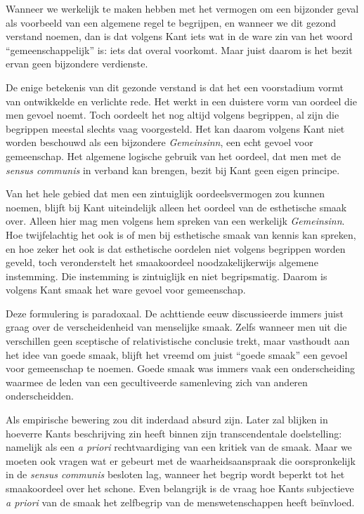 Wanneer we werkelijk te maken hebben met het vermogen om een bijzonder geval als voorbeeld van een algemene regel te begrijpen, en wanneer we dit gezond verstand noemen, dan is dat volgens Kant iets wat in de ware zin van het woord ``gemeenschappelijk'' is: iets dat overal voorkomt. Maar juist daarom is het bezit ervan geen bijzondere verdienste.

De enige betekenis van dit gezonde verstand is dat het een voorstadium vormt van ontwikkelde en verlichte rede. Het werkt in een duistere vorm van oordeel die men gevoel noemt. Toch oordeelt het nog altijd volgens begrippen, al zijn die begrippen meestal slechts vaag voorgesteld. Het kan daarom volgens Kant niet worden beschouwd als een bijzondere \textit{Gemeinsinn}, een echt gevoel voor gemeenschap. Het algemene logische gebruik van het oordeel, dat men met de \textit{sensus communis} in verband kan brengen, bezit bij Kant geen eigen principe.

Van het hele gebied dat men een zintuiglijk oordeelsvermogen zou kunnen noemen, blijft bij Kant uiteindelijk alleen het oordeel van de esthetische smaak over. Alleen hier mag men volgens hem spreken van een werkelijk \textit{Gemeinsinn}. Hoe twijfelachtig het ook is of men bij esthetische smaak van kennis kan spreken, en hoe zeker het ook is dat esthetische oordelen niet volgens begrippen worden geveld, toch veronderstelt het smaakoordeel noodzakelijkerwijs algemene instemming. Die instemming is zintuiglijk en niet begripsmatig. Daarom is volgens Kant smaak het ware gevoel voor gemeenschap.

Deze formulering is paradoxaal. De achttiende eeuw discussieerde immers juist graag over de verscheidenheid van menselijke smaak. Zelfs wanneer men uit die verschillen geen sceptische of relativistische conclusie trekt, maar vasthoudt aan het idee van goede smaak, blijft het vreemd om juist ``goede smaak'' een gevoel voor gemeenschap te noemen. Goede smaak was immers vaak een onderscheiding waarmee de leden van een gecultiveerde samenleving zich van anderen onderscheidden.

Als empirische bewering zou dit inderdaad absurd zijn. Later zal blijken in hoeverre Kants beschrijving zin heeft binnen zijn transcendentale doelstelling: namelijk als een \textit{a priori} rechtvaardiging van een kritiek van de smaak. Maar we moeten ook vragen wat er gebeurt met de waarheidsaanspraak die oorspronkelijk in de \textit{sensus communis} besloten lag, wanneer het begrip wordt beperkt tot het smaakoordeel over het schone. Even belangrijk is de vraag hoe Kants subjectieve \textit{a priori} van de smaak het zelfbegrip van de menswetenschappen heeft beïnvloed.

